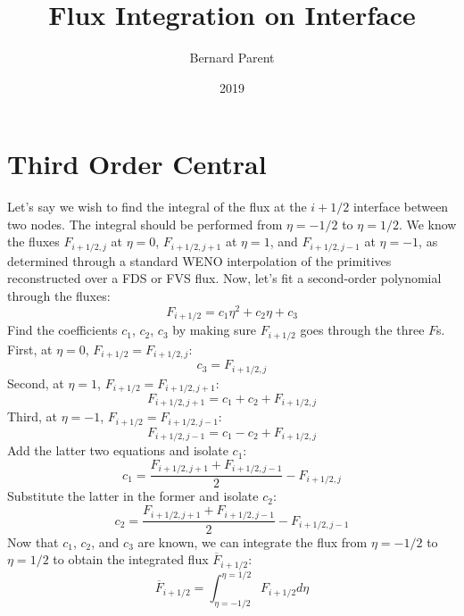 \documentclass{warpdoc}
\author{
  Bernard Parent
}
\title{
  Flux Integration on Interface
}
\date{
  2019
}
\begin{document}
  \pagestyle{headings}
  \setcounter{page}{1}
  \makewarpdoctitle
  \tableofcontents


\section{Third Order Central}

Let's say we wish to find the integral of the flux at the $i+1/2$ interface between two nodes. The integral should be performed from $\eta=-1/2$ to $\eta=1/2$. We know the fluxes $F_{i+1/2,j}$ at $\eta=0$, $F_{i+1/2,j+1}$ at $\eta=1$, and $F_{i+1/2,j-1}$ at $\eta=-1$, as determined through a standard WENO interpolation \cite{jcp:1994:liu}
 of the primitives reconstructed over a FDS \cite{jcp:1981:roe} or FVS flux. Now, let's fit a second-order polynomial through the fluxes:
%
\begin{equation}
F_{i+1/2}=c_1 \eta^2 + c_2 \eta + c_3 
\end{equation}
% 
Find the coefficients $c_1$, $c_2$, $c_3$ by making sure $F_{i+1/2}$ goes through the three $F$s. First, at $\eta=0$, $F_{i+1/2}=F_{i+1/2,j}$:
%
\begin{equation}
c_3=F_{i+1/2,j}
\end{equation}
%
Second, at $\eta=1$, $F_{i+1/2}=F_{i+1/2,j+1}$:
%
\begin{equation}
F_{i+1/2,j+1}=c_1  + c_2  + F_{i+1/2,j} 
\end{equation}
% 
Third, at $\eta=-1$, $F_{i+1/2}=F_{i+1/2,j-1}$:
%
\begin{equation}
F_{i+1/2,j-1}=c_1  - c_2  + F_{i+1/2,j} 
\end{equation}
% 
Add the latter two equations and isolate $c_1$:
%
\begin{equation}
c_1=\frac{F_{i+1/2,j+1}+F_{i+1/2,j-1}}{2}- F_{i+1/2,j} 
\end{equation}
% 
Substitute the latter in the former and isolate $c_2$:
%
\begin{equation}
c_2=\frac{F_{i+1/2,j+1}+F_{i+1/2,j-1}}{2} -F_{i+1/2,j-1}
\end{equation}
% 
Now that $c_1$, $c_2$, and $c_3$ are known, we can integrate the flux from $\eta=-1/2$ to $\eta=1/2$ to obtain the integrated flux $\overline{F}_{i+1/2}$:
%
\begin{equation}
\overline{F}_{i+1/2}=\int_{\eta=-1/2}^{\eta=1/2} F_{i+1/2} d\eta
\end{equation}
\end{document}
